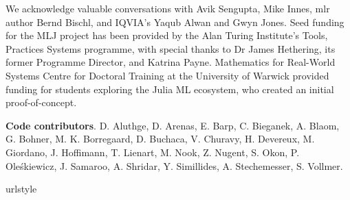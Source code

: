 \documentclass{article}
\begin{document}
We acknowledge valuable conversations with Avik Sengupta, Mike Innes,
mlr author Bernd Bischl, and IQVIA's Yaqub Alwan and Gwyn Jones. Seed
funding for the MLJ project has been provided by the Alan Turing
Institute's Tools, Practices Systems programme, with special thanks
to Dr James Hethering, its former Programme Director, and Katrina
Payne. Mathematics for Real-World Systems Centre for Doctoral Training
at the University of Warwick provided funding for students exploring
the Julia ML ecosystem, who created an initial proof-of-concept.

\textbf{Code contributors}. D. Aluthge, D. Arenas, E. Barp,
C. Bieganek, A. Blaom, G. Bohner, M. K. Borregaard, D. Buchaca,
V. Churavy, H. Devereux, M. Giordano, J. Hoffimann, T. Lienart,
M. Nook, Z. Nugent, S. Okon, P. Oleśkiewicz, J. Samaroo, A. Shridar,
Y. Simillides, A. Stechemesser, S. Vollmer.



\providecommand{\natexlab}[1]{#1}
\providecommand{\url}[1]{\texttt{#1}}
\expandafter\ifx\csname urlstyle\endcsname\relax
  \providecommand{\doi}[1]{doi: #1}\else
  \providecommand{\doi}{doi: \begingroup \urlstyle{rm}\Url}\fi
\end{document}
